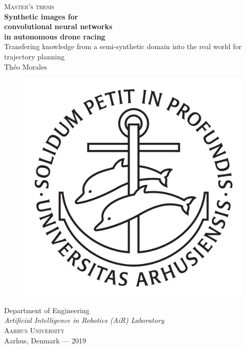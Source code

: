 \newpage
\thispagestyle{empty}
\begin{center}
	\textsc{\large Master's thesis}\\[4cm]		%
	\textbf{\Large Synthetic images for\\convolutional neural
	networks\\[0.2cm]in autonomous drone racing} \\[1cm]
	{\large Transfering knowledge from a semi-synthetic domain into the real
	world for trajectory planning}\\[1cm]
	{\large Théo Morales}
	
	\vfill	
	\begin{figure}[H]
	\centering
	\includegraphics[width=0.2\pdfpagewidth]{figure/auxiliary/ausegl_sort.pdf} \\	
	\end{figure}	\vspace{5mm}	
	
	Department of Engineering\\
	\emph{Artificial Intelligence in Robotics (AiR) Laboratory}\\
	\textsc{Aarhus University} \\
	Aarhus, Denmark — 2019\\
\end{center}



